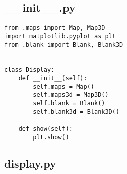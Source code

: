 \subsection{__init__.py}
\begin{verbatim}
from .maps import Map, Map3D
import matplotlib.pyplot as plt
from .blank import Blank, Blank3D


class Display:
    def __init__(self):
        self.maps = Map()
        self.maps3d = Map3D()
        self.blank = Blank()
        self.blank3d = Blank3D()

    def show(self):
        plt.show()

\end{verbatim}
\subsection{display.py}

